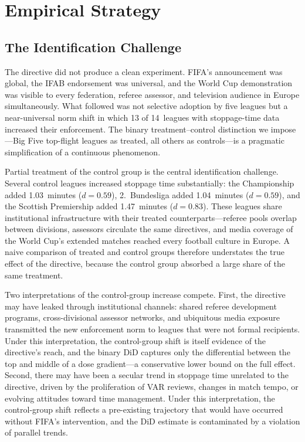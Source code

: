 
\section{Empirical Strategy}
\label{sec:strategy}

\subsection{The Identification Challenge}

The directive did not produce a clean experiment. FIFA's announcement
was global, the IFAB endorsement was universal, and the World Cup
demonstration was visible to every federation, referee assessor, and
television audience in Europe simultaneously. What followed was not
selective adoption by five leagues but a near-universal norm shift in
which 13 of 14~leagues with stoppage-time data increased their
enforcement. The binary treatment--control distinction we impose---Big
Five top-flight leagues as treated, all others as controls---is a
pragmatic simplification of a continuous phenomenon.

Partial treatment of the control group is the central identification
challenge. Several control leagues increased stoppage time
substantially: the Championship added 1.03~minutes ($d = 0.59$),
2.~Bundesliga added 1.04~minutes ($d = 0.59$), and the Scottish
Premiership added 1.47~minutes ($d = 0.83$). These leagues share
institutional infrastructure with their treated counterparts---referee
pools overlap between divisions, assessors circulate the same
directives, and media coverage of the World Cup's extended matches
reached every football culture in Europe. A naive comparison of
treated and control groups therefore understates the true effect of
the directive, because the control group absorbed a large share of
the same treatment.

Two interpretations of the control-group increase compete. First, the
directive may have leaked through institutional channels: shared
referee development programs, cross-divisional assessor networks, and
ubiquitous media exposure transmitted the new enforcement norm to
leagues that were not formal recipients. Under this interpretation,
the control-group shift is itself evidence of the directive's reach,
and the binary DiD captures only the differential between the top and
middle of a dose gradient---a conservative lower bound on the full
effect. Second, there may have been a secular trend in stoppage time
unrelated to the directive, driven by the proliferation of VAR
reviews, changes in match tempo, or evolving attitudes toward time
management. Under this interpretation, the control-group shift
reflects a pre-existing trajectory that would have occurred without
FIFA's intervention, and the DiD estimate is contaminated by a
violation of parallel trends.

